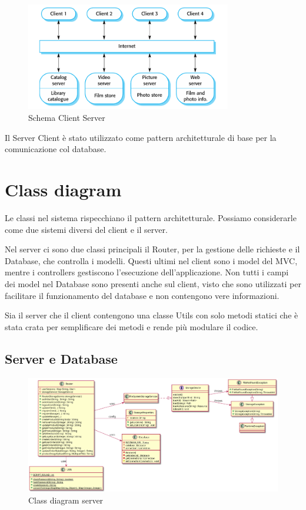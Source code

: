 \documentclass[12pt, a4paper]{report}
\begin{document}
\begin{figure}[h]
  \centering
  \includegraphics[width=0.8\textwidth]{Client-Server.PNG}
  \caption{Schema Client Server}
\end{figure}

Il Server Client è stato utilizzato come pattern architetturale di base per la
comunicazione col database.

\newpage


\section{Class diagram}

Le classi nel sistema rispecchiano il pattern architetturale. Possiamo
considerarle come due sistemi diversi del client e il server. 

Nel server ci sono due classi principali il Router, per la gestione delle
richieste e il Database, che controlla i modelli. Questi ultimi nel client sono
i model del MVC, mentre i controllers gestiscono l'esecuzione
dell'applicazione. Non tutti i campi dei model nel Database sono presenti anche
sul client, visto che sono utilizzati per facilitare il funzionamento del
database e non contengono vere informazioni.

Sia il server che il client contengono una classe Utils con solo metodi statici
che è stata crata per semplificare dei metodi e rende più modulare il codice.

\subsection{Server e Database}

\begin{figure}[h]
  \centering
  \includegraphics[width=\textwidth]{router_class.png}
  \caption{Class diagram server}
\end{figure}
\end{document}
